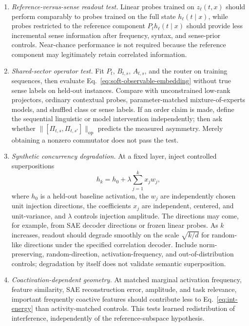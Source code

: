\documentclass[
  aps,
  reprint,
  superscriptaddress,
  floatfix,
  nofootinbib,
  longbibliography
]{revtex4-2}
\newcommand{\opnorm}[1]{\lVert #1 \rVert_{\mathrm{op}}}
\begin{document}
\begin{enumerate}
\item \emph{Reference-versus-sense readout test.}
Linear probes trained on $z_\ell(t,x)$ should perform comparably to
probes trained on the full state $h_\ell(t\mid x)$, while probes
restricted to the reference component $P_t h_\ell(t\mid x)$ should provide
less incremental sense information after frequency, syntax, and sense-prior
controls.  Near-chance performance is not required because the reference
component may legitimately retain correlated information.

\item \emph{Shared-sector operator test.}
Fit $P_t$, $B_{t,s}$, $A_{t,s}$, and the router on training sequences, then evaluate
Eq.~\eqref{eq:soft-observable-embedding} without true sense labels on held-out
instances. Compare with unconstrained low-rank projectors, ordinary contextual
probes, parameter-matched mixture-of-experts models, and shuffled class or
sense labels.  If an order claim is made, define the sequential linguistic or model
intervention independently; then ask whether
$\opnorm{[\Pi_{t,s},\Pi_{t,s'}]}$ predicts the measured asymmetry.  Merely
obtaining a nonzero commutator does not pass the test.

\item \emph{Synthetic concurrency degradation.}
At a fixed layer, inject controlled superpositions
%
\begin{equation}
h_k=h_0+\lambda\sum_{j=1}^k x_j w_j,
\end{equation}
%
where $h_0$ is a held-out baseline activation, the $w_j$ are independently
chosen unit injection directions, the coefficients $x_j$ are independent,
centered, and unit-variance, and $\lambda$ controls injection amplitude.  The
directions may come, for example, from SAE decoder directions or frozen linear
probes. As $k$ increases, readout
should degrade smoothly on the scale $\sqrt{k/d}$ for random-like
directions under the specified correlation decoder.  Include norm-preserving,
random-direction, activation-frequency, and out-of-distribution controls;
degradation by itself does not validate semantic superposition.

\item \emph{Coactivation-dependent geometry.}
At matched marginal activation frequency, feature similarity, SAE
reconstruction error, amplitude, and task relevance, important frequently
coactive features should contribute less to Eq.~\eqref{eq:int-energy} than
activity-matched controls.  This tests learned redistribution of interference,
independently of the reference-subspace hypothesis.
\end{enumerate}
\end{document}
